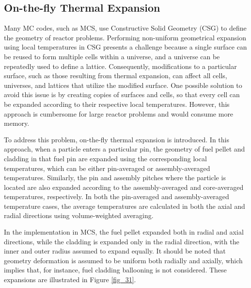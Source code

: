 \subsection{On-the-fly Thermal Expansion} \label{sec33}

Many MC codes, such as MCS, use Constructive Solid Geometry (CSG) to define the geometry of reactor problems. Performing non-uniform geometrical expansion using local temperatures in CSG presents a challenge because a single surface can be reused to form multiple cells within a universe, and a universe can be repeatedly used to define a lattice. Consequently, modifications to a particular surface, such as those resulting from thermal expansion, can affect all cells, universes, and lattices that utilize the modified surface. One possible solution to avoid this issue is by creating copies of surfaces and cells, so that every cell can be expanded according to their respective local temperatures. However, this approach is cumbersome for large reactor problems and would consume more memory.

To address this problem, on-the-fly thermal expansion is introduced. In this approach, when a particle enters a particular pin, the geometry of fuel pellet and cladding in that fuel pin are expanded using the corresponding local temperatures, which can be either pin-averaged or assembly-averaged temperatures. Similarly, the pin and assembly pitches where the particle is located are also expanded according to the assembly-averaged and core-averaged temperatures, respectively. In both the pin-averaged and assembly-averaged temperature cases, the average temperatures are calculated in both the axial and radial directions using volume-weighted averaging.

In the implementation in MCS, the fuel pellet expanded both in radial and axial directions, while the cladding is expanded only in the radial direction, with the inner and outer radius assumed to expand equally. It should be noted that geometry deformation is assumed to be uniform both radially and axially, which implies that, for instance, fuel cladding ballooning is not considered. These expansions are illustrated in Figure \ref{fig_31}.

